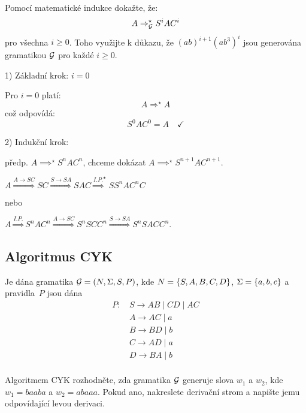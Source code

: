 Pomocí matematické indukce dokažte, že:
\[
A \Rightarrow_{\mathcal{G}}^{\star} S^i A C^i
\]
pro všechna $i \geq 0$. Toho využijte k důkazu, že $(ab)^{i+1}(ab^3)^i$ jsou generována gramatikou $\mathcal{G}$ pro
každé $i \geq 0$.

1) Základní krok: $i = 0$

Pro $i = 0$ platí:
\[
A {\Longrightarrow^\star} A
\]
což odpovídá:
\[
S^0 A C^0 = A \quad \checkmark
\]

2) Indukční krok:

předp. $A {\implies^\star} S^n A C^n$, chceme dokázat $A \implies^{\star} S^{n+1} A C^{n+1}$.

$A \stackrel{A \rightarrow SC}{\Longrightarrow} SC \stackrel{S \rightarrow SA}{\Longrightarrow} SAC \stackrel{I.P.}
{\Longrightarrow}^{\star} SS^nAC^nC$

nebo

$A \stackrel{I.P.}{\Longrightarrow} S^n A C^n \stackrel{A \rightarrow SC}{\Longrightarrow} S^nSCC^n \stackrel
{S \rightarrow SA}{\Longrightarrow} S^nSACC^n$.

\newpage
\subsection{Algoritmus CYK} %
Je dána gramatika $\mathcal{G} = (N, \Sigma, S, P )$, kde $N = \left\lbrace S, A, B, C, D \right\rbrace$, $\Sigma = \left\lbrace a, b, c \right\rbrace$ a
pravidla~$P$ jsou dána
\begin{align*}
    P \text{: } & S \rightarrow AB \mid CD \mid AC\\
    & A \rightarrow AC \mid a \\
    & B \rightarrow BD \mid b \\
    & C \rightarrow AD \mid a \\
    & D \rightarrow BA \mid b \\
\end{align*}

Algoritmem CYK rozhodněte, zda gramatika $\mathcal{G}$ generuje slova $w_1$ a $w_2$, kde $w_1 = baaba$ a $w_2 = abaaa$.
Pokud ano, nakreslete derivační strom a napište jemu odpovídající levou derivaci.

